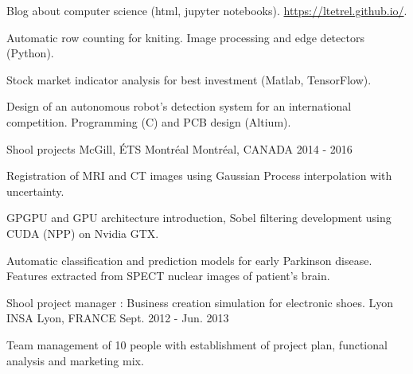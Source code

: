 


\begin{cventries}


\cventry
{} %
{} %
{} %
{} %
{ %
\vspace{-5mm}
\begin{cvitems}
\item {Blog about computer science (html, jupyter notebooks). \url{https://ltetrel.github.io/}.}
\item {Automatic row counting for kniting. Image processing and edge detectors (Python).}
\item {Stock market indicator analysis for best investment (Matlab, TensorFlow).}
\item {Design of an autonomous robot's detection system for an international competition. Programming (C) and PCB design (Altium).}
\end{cvitems}
}


\cventry
{Shool projects} %
{McGill, ÉTS Montréal} %
{Montréal, CANADA} %
{2014 - 2016} %
{ %
\begin{cvitems}
\item {Registration of MRI and CT images using Gaussian Process interpolation with uncertainty.}
\item {GPGPU and GPU architecture introduction, Sobel filtering development using CUDA (NPP) on Nvidia GTX.}
\item {Automatic classification and prediction models for early Parkinson disease. Features extracted from SPECT nuclear images of patient's brain.}
\end{cvitems}
}


\cventry
{Shool project manager : Business creation simulation for electronic shoes.} %
{Lyon INSA} %
{Lyon, FRANCE} %
{Sept. 2012 - Jun. 2013} %
{ %
\begin{cvitems}
\item {Team management of 10 people with establishment of project plan, functional analysis and marketing mix.}
\end{cvitems}
}


\end{cventries}
